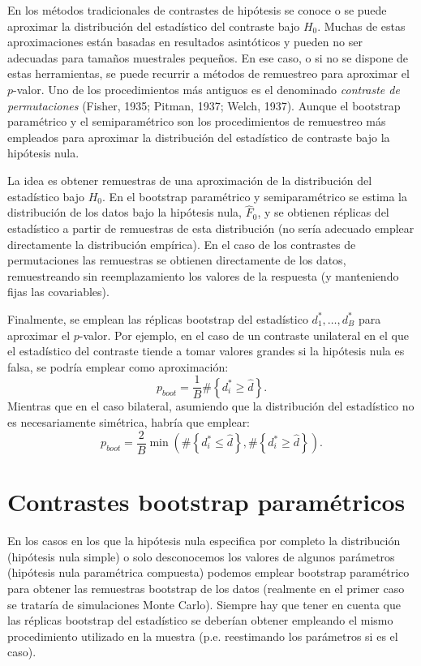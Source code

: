 \documentclass[
]{book}
\theoremstyle{definition}
\theoremstyle{definition}
\theoremstyle{definition}
\theoremstyle{remark}
\begin{document}
En los métodos tradicionales de contrastes de hipótesis se conoce o se
puede aproximar la distribución del estadístico del contraste bajo \(H_0\).
Muchas de estas aproximaciones están basadas en resultados asintóticos
y pueden no ser adecuadas para tamaños muestrales pequeños.
En ese caso, o si no se dispone de estas herramientas,
se puede recurrir a métodos de remuestreo para aproximar el \(p\)-valor.
Uno de los procedimientos más antiguos es el denominado
\emph{contraste de permutaciones} (Fisher, 1935; Pitman, 1937; Welch, 1937).
Aunque el bootstrap paramétrico y el semiparamétrico son los
procedimientos de remuestreo más empleados para aproximar
la distribución del estadístico de contraste bajo la hipótesis nula.

La idea es obtener remuestras de una aproximación de la distribución del
estadístico bajo \(H_0\).
En el bootstrap paramétrico y semiparamétrico se estima la distribución
de los datos bajo la hipótesis nula, \(\hat{F}_0\), y se obtienen réplicas del
estadístico a partir de remuestras de esta distribución (no sería adecuado
emplear directamente la distribución empírica).
En el caso de los contrastes de permutaciones las remuestras se obtienen
directamente de los datos, remuestreando sin reemplazamiento los valores
de la respuesta (y manteniendo fijas las covariables).

Finalmente, se emplean las réplicas bootstrap
del estadístico \(d_1^{\ast},\ldots, d_B^{\ast}\) para aproximar el \(p\)-valor.
Por ejemplo, en el caso de un contraste unilateral en el que el estadístico del
contraste tiende a tomar valores grandes si la hipótesis nula es falsa,
se podría emplear como aproximación:
\[p_{boot} = \frac{1}{B}\#\left\{ d_i^{\ast} \geq \hat{d} \right\}.\]
Mientras que en el caso bilateral, asumiendo que la distribución del estadístico
no es necesariamente simétrica, habría que emplear:
\[p_{boot} = \frac{2}{B} \min \left(\#\left\{ d_i^{\ast} \leq \hat{d} \right\},
\#\left\{ d_i^{\ast} \geq \hat{d} \right\}\right).\]

\hypertarget{contrastes-bootstrap-paramuxe9tricos}{%
\section{Contrastes bootstrap paramétricos}\label{contrastes-bootstrap-paramuxe9tricos}}

En los casos en los que la hipótesis nula especifica por completo la distribución
(hipótesis nula simple) o solo desconocemos los valores de algunos parámetros
(hipótesis nula paramétrica compuesta) podemos emplear
bootstrap paramétrico para obtener las remuestras bootstrap de los datos
(realmente en el primer caso se trataría de simulaciones Monte Carlo).
Siempre hay que tener en cuenta que las réplicas bootstrap del estadístico se
deberían obtener empleando el mismo procedimiento utilizado en la muestra
(p.e. reestimando los parámetros si es el caso).
\end{document}
